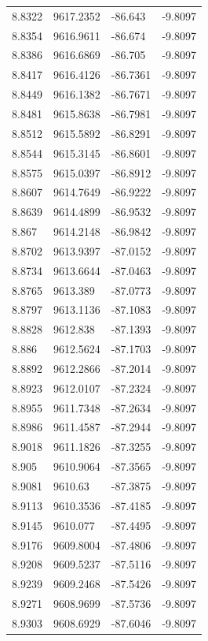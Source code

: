 \begin{table}[H]
\begin{tabular}{llll}
8.8322 & 9617.2352 & -86.643 & -9.8097 \\
8.8354 & 9616.9611 & -86.674 & -9.8097 \\
8.8386 & 9616.6869 & -86.705 & -9.8097 \\
8.8417 & 9616.4126 & -86.7361 & -9.8097 \\
8.8449 & 9616.1382 & -86.7671 & -9.8097 \\
8.8481 & 9615.8638 & -86.7981 & -9.8097 \\
8.8512 & 9615.5892 & -86.8291 & -9.8097 \\
8.8544 & 9615.3145 & -86.8601 & -9.8097 \\
8.8575 & 9615.0397 & -86.8912 & -9.8097 \\
8.8607 & 9614.7649 & -86.9222 & -9.8097 \\
8.8639 & 9614.4899 & -86.9532 & -9.8097 \\
8.867 & 9614.2148 & -86.9842 & -9.8097 \\
8.8702 & 9613.9397 & -87.0152 & -9.8097 \\
8.8734 & 9613.6644 & -87.0463 & -9.8097 \\
8.8765 & 9613.389 & -87.0773 & -9.8097 \\
8.8797 & 9613.1136 & -87.1083 & -9.8097 \\
8.8828 & 9612.838 & -87.1393 & -9.8097 \\
8.886 & 9612.5624 & -87.1703 & -9.8097 \\
8.8892 & 9612.2866 & -87.2014 & -9.8097 \\
8.8923 & 9612.0107 & -87.2324 & -9.8097 \\
8.8955 & 9611.7348 & -87.2634 & -9.8097 \\
8.8986 & 9611.4587 & -87.2944 & -9.8097 \\
8.9018 & 9611.1826 & -87.3255 & -9.8097 \\
8.905 & 9610.9064 & -87.3565 & -9.8097 \\
8.9081 & 9610.63 & -87.3875 & -9.8097 \\
8.9113 & 9610.3536 & -87.4185 & -9.8097 \\
8.9145 & 9610.077 & -87.4495 & -9.8097 \\
8.9176 & 9609.8004 & -87.4806 & -9.8097 \\
8.9208 & 9609.5237 & -87.5116 & -9.8097 \\
8.9239 & 9609.2468 & -87.5426 & -9.8097 \\
8.9271 & 9608.9699 & -87.5736 & -9.8097 \\
8.9303 & 9608.6929 & -87.6046 & -9.8097 \\

\end{tabular}
\end{table}

